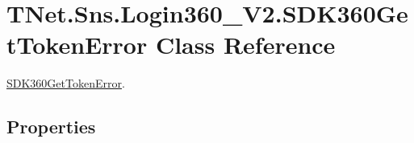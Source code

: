 \hypertarget{class_t_net_1_1_sns_1_1_login360___v2_1_1_s_d_k360_get_token_error}{}\section{T\+Net.\+Sns.\+Login360\+\_\+\+V2.\+S\+D\+K360\+Get\+Token\+Error Class Reference}
\label{class_t_net_1_1_sns_1_1_login360___v2_1_1_s_d_k360_get_token_error}


\mbox{\hyperlink{class_t_net_1_1_sns_1_1_login360___v2_1_1_s_d_k360_get_token_error}{S\+D\+K360\+Get\+Token\+Error}}.  


\subsection*{Properties}
